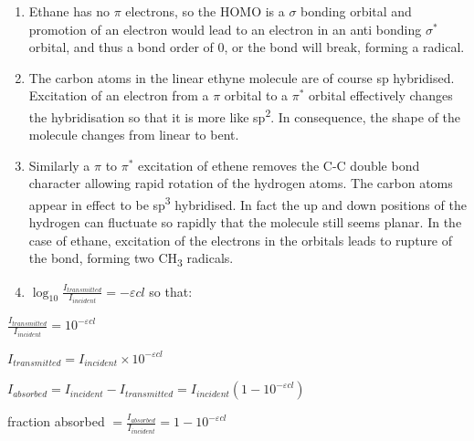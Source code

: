 \documentclass[
]{book}
\begin{document}
\begin{enumerate}
\def\labelenumi{\arabic{enumi}.}
\item
  Ethane has no \(\pi\) electrons, so the HOMO is a \(\sigma\) bonding orbital and promotion of an electron would lead to an electron in an anti bonding \(\sigma^\ast\) orbital, and thus a bond order of 0, or the bond will break, forming a radical.
\item
  The carbon atoms in the linear ethyne molecule are of course sp hybridised. Excitation of an electron from a \(\pi\) orbital to a \(\pi^\ast\) orbital effectively changes the hybridisation so that it is more like sp\textsuperscript{2}. In consequence, the shape of the molecule changes from linear to bent.
\item
  Similarly a \(\pi\) to \(\pi^\ast\) excitation of ethene removes the C-C double bond character allowing rapid rotation of the hydrogen atoms. The carbon atoms appear in effect to be sp\textsuperscript{3} hybridised. In fact the up and down positions of the hydrogen can fluctuate so rapidly that the molecule still seems planar. In the case of ethane, excitation of the electrons in the orbitals leads to rupture of the bond, forming two CH\textsubscript{3} radicals.
\item
  \(\log_{10} \frac{I_{transmitted}}{I_{incident}} = - \varepsilon cl\) so that:
\end{enumerate}

\(\frac{I_{transmitted}}{I_{incident}} =10^{- \varepsilon cl }\)

\(I_{transmitted} = I_{incident} \times 10^{- \varepsilon cl }\)

\(I_{absorbed} = I_{incident} - I_{transmitted} = I_{incident} ( 1 - 10^{- \varepsilon cl })\)

fraction absorbed \(= \frac{I_{absorbed}}{I_{incident}} = 1 - 10^{- \varepsilon cl }\)
\end{document}
